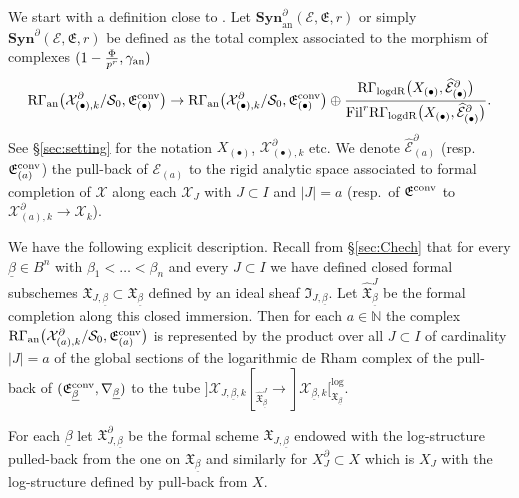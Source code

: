 \documentclass[asterisque,english]{smfart}
\begin{document}
We start with a definition close to \cite{Ber}. Let $\mathbf{Syn}^\partial_{\mathrm{an}}(\mathcal{E},\mathfrak{E},r)$ or simply $\mathbf{Syn}^\partial(\mathcal{E},\mathfrak{E},r)$  be defined as the total complex associated to the morphism  of complexes $(1-\frac{\Phi}{p^r},\gamma_{\rm an})$ $$\mathrm{R}\Gamma_{\mathrm{an}}\bigl(\mathcal{X}_{(\bullet),k}^\partial/\mathcal{S}_0,\mathfrak{E}_{(\bullet)}^{\rm conv}\bigr)\to \mathrm{R}\Gamma_{\mathrm{an}}\bigl(\mathcal{X}_{(\bullet),k}^\partial/\mathcal{S}_0,\mathfrak{E}_{(\bullet)}^{\rm conv}\bigr) \oplus \frac{ \mathrm{R}\Gamma_{\mathrm{logdR}}\bigl(X_{(\bullet)}, \widehat{\mathcal{E}}^\partial_{(\bullet)}\bigr) }{\mathrm{Fil}^r \mathrm{R}\Gamma_{\mathrm{logdR}}\bigl(X_{(\bullet)},\widehat{\mathcal{E}}^\partial_{(\bullet)}\bigr)}.$$See \S \ref{sec:setting} for the notation $X_{(\bullet)}$, $\mathcal{X}_{(\bullet),k}^\partial$ etc. We denote $\widehat{\mathcal{E}}^\partial_{(a)}$ (resp.~$\mathfrak{E}_{(a)}^{\rm conv}$)  the pull-back of $\mathcal{E}_{(a)}$ to the rigid analytic space associated to formal completion of $\mathcal{X}$ along each $\mathcal{X}_{J}$ with $J\subset I$ and $\vert J\vert=a$ (resp.~of $\mathfrak{E}^{\rm conv}$ to $\mathcal{X}_{(a),k}^\partial\to \mathcal{X}_k$).


We have the following explicit description. Recall from \S \ref{sec:Chech} that for every $\underline{\beta}\in B^n$ with $\beta_1<\ldots < \beta_n$ and every $J\subset I$ we have defined closed formal subschemes $\mathfrak{X}_{J,\underline{\beta}} \subset \mathfrak{X}_{\underline{\beta}}$ defined by an ideal sheaf  $\mathfrak{I}_{J,\underline{\beta}}$. Let $\widehat{\mathfrak{X}}^J_{\underline{\beta}}$ be the formal completion along this closed immersion.  Then for each $a\in \mathbb{N }$ the complex $\mathrm{R}\Gamma_{\mathrm{an}}\bigl(\mathcal{X}_{(a),k}^\partial/\mathcal{S}_0,\mathfrak{E}_{(a)}^{\rm conv}\bigr)$ is represented by the product over all $J\subset I$ of cardinality $\vert J \vert=a$ of the global sections of the logarithmic de Rham complex of the pull-back of $(\mathfrak{E}_{\underline{\beta}}^{\rm conv},\nabla_{\underline{\beta}})$ to the tube $]\mathcal{X}_{J,\underline{\beta},k}[_{\widehat{\mathfrak{X}}^J_{\underline{\beta}}} \to ]\mathcal{X}_{\underline{\beta},k}[_{\mathfrak{X}_{\underline{\beta}}}^{\log} $. 




For each $\underline{\beta}$ let $\mathfrak{X}_{J,\underline{\beta}}^\partial $ be the formal scheme $\mathfrak{X}_{J,\underline{\beta}} $ endowed with the log-structure pulled-back from the one on $\mathfrak{X}_{\underline{\beta}}$ and similarly for  $X_J^\partial \subset X$ which is $X_J$ with the log-structure defined by pull-back from $X$. 
\end{document}
